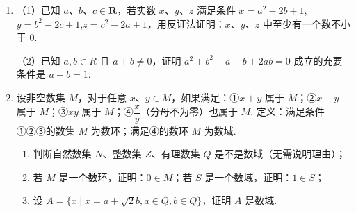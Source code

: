 \documentclass[a4paper,11pt]{article}
\begin{document}
\begin{enumerate}
\ansspace[6]

\item （1）已知 $a$、$b$、$c\in\mathbf{R}$，若实数 $x$、$y$、$z$ 满足条件 $x=a^2-2b+1$,$y=b^2-2c+1$,$z=c^2-2a+1$，用反证法证明：$x$、$y$、$z$ 中至少有一个数不小于 0.

（2）已知 $a,b\in R$ 且 $a+b\neq0$，证明 $a^2+b^2-a-b+2ab=0$ 成立的充要条件是 $a+b=1$.

\ifanswer
\solbegin
{}
\solend
\fi

\ansspace[6]

\item 设非空数集 $M$，对于任意 $x$、$y\in M$，如果满足：①$x+y$ 属于 $M$；②$x-y$ 属于 $M$；③$xy$ 属于 $M$；④$\dfrac xy$（分母不为零）也属于 $M$. 定义：满足条件①②③的数集 $M$ 为数环；满足④的数环 $M$ 为数域.

\begin{enumerate}[label=(\arabic*)]
\item 判断自然数集 $N$、整数集 $Z$、有理数集 $Q$ 是不是数域（无需说明理由）；
\item 若 $M$ 是一个数环，证明：$0\in M$；若 $S$ 是一个数域，证明：$1\in S$；
\item 设 $A=\{x\mid x=a+\sqrt2b,a\in Q,b\in Q\}$，证明 $A$ 是数域.
\end{enumerate}


\end{enumerate}
\end{document}
